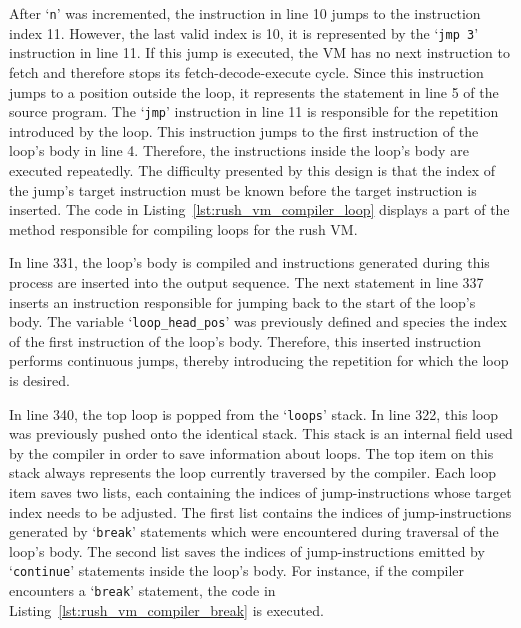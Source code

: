 After `\texttt{n}' was incremented, the instruction in line 10 jumps to the instruction index 11.
However, the last valid index is 10, it is represented by the `\texttt{jmp 3}' instruction in line 11.
If this jump is executed, the VM has no next instruction to fetch and therefore stops its fetch-decode-execute cycle.
Since this instruction jumps to a position outside the loop, it represents the  statement in line 5 of the source program.
The `\texttt{jmp}' instruction in line 11 is responsible for the repetition introduced by the loop.
This instruction jumps to the first instruction of the loop's body in line 4.
Therefore, the instructions inside the loop's body are executed repeatedly.
The difficulty presented by this design is that the index of the jump's target instruction must be known before the target instruction is inserted.
The code in Listing~\ref{lst:rush_vm_compiler_loop} displays a part of the method responsible for compiling loops for the rush VM\@.


In line 331, the loop's body is compiled and instructions generated during this process are inserted into the output sequence.
The next statement in line 337 inserts an instruction responsible for jumping back to the start of the loop's body.
The variable `\texttt{loop\_head\_pos}' was previously defined and species the index of the first instruction of the loop's body.
Therefore, this inserted instruction performs continuous jumps, thereby introducing the repetition for which the loop is desired.

In line 340, the top loop is popped from the `\texttt{loops}' stack.
In line 322, this loop was previously pushed onto the identical stack.
This stack is an internal field used by the compiler in order to save information about loops.
The top item on this stack always represents the loop currently traversed by the compiler.
Each loop item saves two lists, each containing the indices of jump-instructions whose target index needs to be adjusted.
The first list contains the indices of jump-instructions generated by `\texttt{break}' statements which were encountered during traversal of the loop's body.
The second list saves the indices of jump-instructions emitted by `\texttt{continue}' statements inside the loop's body.
For instance, if the compiler encounters a `\texttt{break}' statement, the code in Listing~\ref{lst:rush_vm_compiler_break} is executed.

